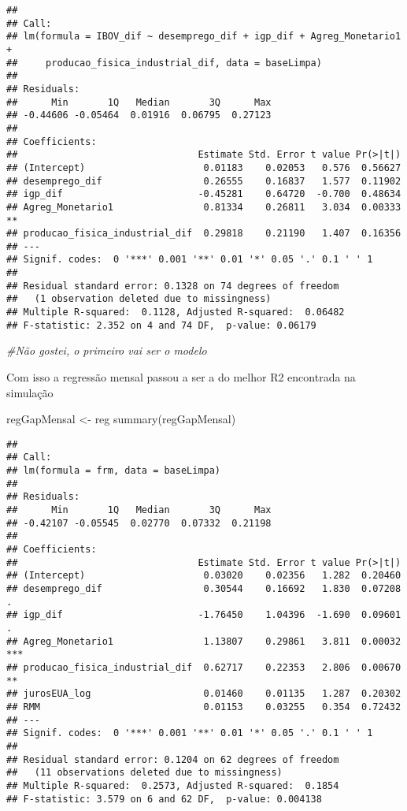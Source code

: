 \documentclass[
]{article}
\newenvironment{Shaded}{\begin{snugshade}}{\end{snugshade}}
\newcommand{\CommentTok}[1]{\textcolor[rgb]{0.56,0.35,0.01}{\textit{#1}}}
\newcommand{\FunctionTok}[1]{\textcolor[rgb]{0.00,0.00,0.00}{#1}}
\newcommand{\NormalTok}[1]{#1}
\newcommand{\OtherTok}[1]{\textcolor[rgb]{0.56,0.35,0.01}{#1}}
\begin{document}
\begin{verbatim}
## 
## Call:
## lm(formula = IBOV_dif ~ desemprego_dif + igp_dif + Agreg_Monetario1 + 
##     producao_fisica_industrial_dif, data = baseLimpa)
## 
## Residuals:
##      Min       1Q   Median       3Q      Max 
## -0.44606 -0.05464  0.01916  0.06795  0.27123 
## 
## Coefficients:
##                                Estimate Std. Error t value Pr(>|t|)   
## (Intercept)                     0.01183    0.02053   0.576  0.56627   
## desemprego_dif                  0.26555    0.16837   1.577  0.11902   
## igp_dif                        -0.45281    0.64720  -0.700  0.48634   
## Agreg_Monetario1                0.81334    0.26811   3.034  0.00333 **
## producao_fisica_industrial_dif  0.29818    0.21190   1.407  0.16356   
## ---
## Signif. codes:  0 '***' 0.001 '**' 0.01 '*' 0.05 '.' 0.1 ' ' 1
## 
## Residual standard error: 0.1328 on 74 degrees of freedom
##   (1 observation deleted due to missingness)
## Multiple R-squared:  0.1128, Adjusted R-squared:  0.06482 
## F-statistic: 2.352 on 4 and 74 DF,  p-value: 0.06179
\end{verbatim}

\begin{Shaded}
\begin{Highlighting}[]
\CommentTok{\#Não gostei, o primeiro vai ser o modelo}
\end{Highlighting}
\end{Shaded}

Com isso a regressão mensal passou a ser a do melhor R2 encontrada na
simulação

\begin{Shaded}
\begin{Highlighting}[]
\NormalTok{regGapMensal }\OtherTok{\textless{}{-}}\NormalTok{ reg}
\FunctionTok{summary}\NormalTok{(regGapMensal)}
\end{Highlighting}
\end{Shaded}

\begin{verbatim}
## 
## Call:
## lm(formula = frm, data = baseLimpa)
## 
## Residuals:
##      Min       1Q   Median       3Q      Max 
## -0.42107 -0.05545  0.02770  0.07332  0.21198 
## 
## Coefficients:
##                                Estimate Std. Error t value Pr(>|t|)    
## (Intercept)                     0.03020    0.02356   1.282  0.20460    
## desemprego_dif                  0.30544    0.16692   1.830  0.07208 .  
## igp_dif                        -1.76450    1.04396  -1.690  0.09601 .  
## Agreg_Monetario1                1.13807    0.29861   3.811  0.00032 ***
## producao_fisica_industrial_dif  0.62717    0.22353   2.806  0.00670 ** 
## jurosEUA_log                    0.01460    0.01135   1.287  0.20302    
## RMM                             0.01153    0.03255   0.354  0.72432    
## ---
## Signif. codes:  0 '***' 0.001 '**' 0.01 '*' 0.05 '.' 0.1 ' ' 1
## 
## Residual standard error: 0.1204 on 62 degrees of freedom
##   (11 observations deleted due to missingness)
## Multiple R-squared:  0.2573, Adjusted R-squared:  0.1854 
## F-statistic: 3.579 on 6 and 62 DF,  p-value: 0.004138
\end{verbatim}
\end{document}
